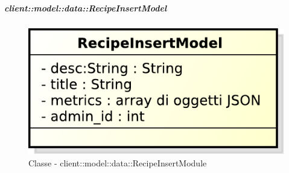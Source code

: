 		\subparagraph{client::model::data::RecipeInsertModel} %
		\label{subp:client_model_data_recipeinsertmodel}
			\begin{figure}[htbp]
				\centering
				\centerline{\includegraphics[scale=0.7]{./images/client/classes/model/recipe_insert_model.pdf}}
				\caption{Classe - client::model::data::RecipeInsertModule}
			\end{figure}

